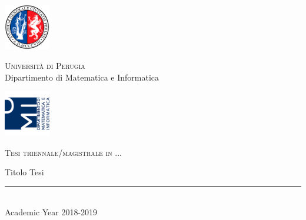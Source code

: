 
\thispagestyle{empty} %

	\noindent %
	\includegraphics[width=0.15\textwidth]{img/logoUniPg}
	\begin{minipage}[b]{0.7\textwidth}
		\centering
		{\Large \textcolor{blu_dmi}{\textsc{Universit{\`a} di Perugia}}}\\
		\vspace{0.4 em}
		{\large \textcolor{blu_dmi}{Dipartimento di Matematica e Informatica}}
		\vspace{0.6 em}
	\end{minipage}%
	\includegraphics[width=0.15\textwidth]{img/logoDMI}
	
	\vspace{5 em}

	\begin{center}
		
		{\large \textcolor{blu_dmi}{\textsc{Tesi triennale/magistrale in ...}}}
		\vspace{8 em}
		
		{\Huge \textcolor{blu_dmi}{Titolo Tesi}}
		\vspace{10 em}
		
		
		\vspace{6 em}
		\vfill
		
		\textcolor{blu_dmi}{\rule{380pt}{.4pt}}\\
		\vspace{1.2 em}
		\large{\textcolor{blu_dmi}{Academic Year 2018-2019}}
		
		
		
		
	\end{center}

